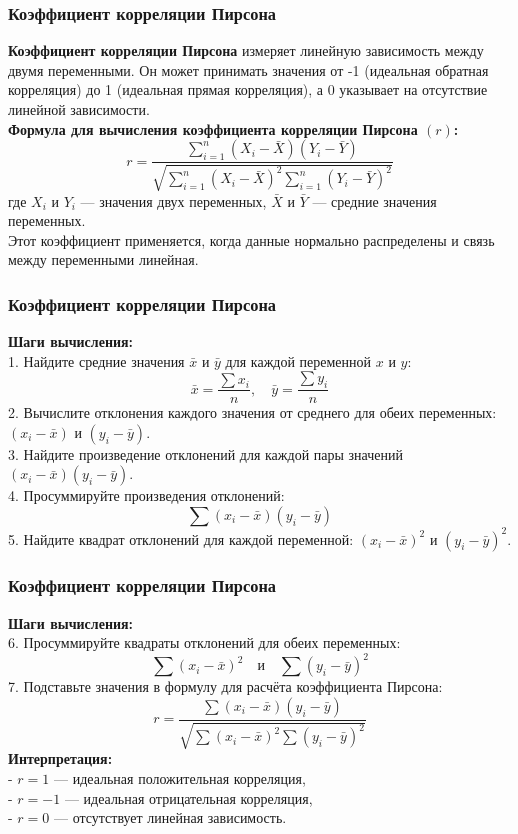 \documentclass[aspectratio=169]{beamer}
\begin{document}
\begin{frame}
\frametitle{Коэффициент корреляции Пирсона}
{\bf Коэффициент корреляции Пирсона} измеряет линейную зависимость между двумя переменными. Он может принимать значения от -1 (идеальная обратная корреляция) до 1 (идеальная прямая корреляция), а 0 указывает на отсутствие линейной зависимости.\\
{\bf Формула для вычисления коэффициента корреляции Пирсона $(r)$:}
     \[
     r = \frac{\sum_{i=1}^{n} (X_i - \bar{X})(Y_i - \bar{Y})}{\sqrt{\sum_{i=1}^{n} (X_i - \bar{X})^2 \sum_{i=1}^{n} (Y_i - \bar{Y})^2}}
     \]
где \(X_i\) и \(Y_i\) — значения двух переменных, \(\bar{X}\) и \(\bar{Y}\) — средние значения переменных.\\
Этот коэффициент применяется, когда данные нормально распределены и связь между переменными линейная.
\end{frame}

\begin{frame}
\frametitle{Коэффициент корреляции Пирсона}
{\bf Шаги вычисления:}\\
1. Найдите средние значения \( \bar{x} \) и \( \bar{y} \) для каждой переменной \( x \) и \( y \):
   \[
   \bar{x} = \frac{\sum x_i}{n}, \quad \bar{y} = \frac{\sum y_i}{n}
   \]
2. Вычислите отклонения каждого значения от среднего для обеих переменных: \( (x_i - \bar{x}) \) и \( (y_i - \bar{y}) \).\\
3. Найдите произведение отклонений для каждой пары значений \( (x_i - \bar{x})(y_i - \bar{y}) \).\\
4. Просуммируйте произведения отклонений:\\
   \[
   \sum (x_i - \bar{x})(y_i - \bar{y})
   \]
5. Найдите квадрат отклонений для каждой переменной: \( (x_i - \bar{x})^2 \) и \( (y_i - \bar{y})^2 \).\\
\end{frame}

\begin{frame}
\frametitle{Коэффициент корреляции Пирсона}
{\bf Шаги вычисления:}\\
6. Просуммируйте квадраты отклонений для обеих переменных:
   \[
   \sum (x_i - \bar{x})^2 \quad \text{и} \quad \sum (y_i - \bar{y})^2
   \]
7. Подставьте значения в формулу для расчёта коэффициента Пирсона:
   \[
   r = \frac{\sum (x_i - \bar{x})(y_i - \bar{y})}{\sqrt{\sum (x_i - \bar{x})^2 \sum (y_i - \bar{y})^2}}
   \]
{\bf Интерпретация:}\\
\quad - \( r = 1 \) — идеальная положительная корреляция,\\
\quad - \( r = -1 \) — идеальная отрицательная корреляция,\\
\quad - \( r = 0 \) — отсутствует линейная зависимость.\\
\end{frame}
\end{document}
